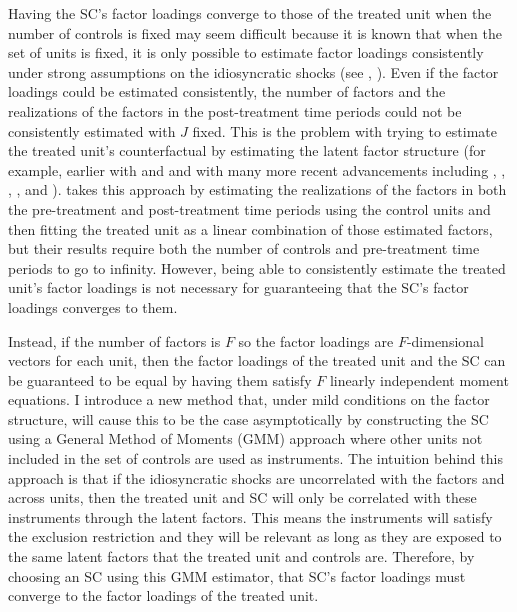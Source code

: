 \documentclass{article}
\begin{document}
\par
Having the SC's factor loadings converge to those of the treated unit when the number of controls is fixed may seem difficult because it is known that when the set of units is fixed, it is only possible to estimate factor loadings consistently under strong assumptions on the idiosyncratic shocks (see \cite{NumberOfFactors}, \cite{Anderson1984}). Even if the factor loadings could be estimated consistently, the number of factors and the realizations of the factors in the post-treatment time periods could not be consistently estimated with $J$ fixed. This is the problem with trying to estimate the treated unit's counterfactual by estimating the latent factor structure (for example, earlier with \cite{CHAMBERLAIN1984} and \cite{LiangandZeger} and with many more recent advancements including \cite{HeckamnLeamer2001}, \cite{MoonWeidner2015}, \cite{moon_weidner_2017}, \cite{Bai2009_ife}, and \cite{Pearson2006}). \cite{IFE_with_SC} takes this approach by estimating the realizations of the factors in both the pre-treatment and post-treatment time periods using the control units and then fitting the treated unit as a linear combination of those estimated factors, but their results require both the number of controls and pre-treatment time periods to go to infinity. However, being able to consistently estimate the treated unit's factor loadings is not necessary for guaranteeing that the SC's factor loadings converges to them.  
\par
Instead, if the number of factors is $F$ so the factor loadings are $F$-dimensional vectors for each unit, then the factor loadings of the treated unit and the SC can be guaranteed to be equal by having them satisfy $F$ linearly independent moment equations. I introduce a new method that, under mild conditions on the factor structure, will cause this to be the case asymptotically by constructing the SC using a General Method of Moments (GMM) approach where other units not included in the set of controls are used as instruments. The intuition behind this approach is that if the idiosyncratic shocks are uncorrelated with the factors and across units, then the treated unit and SC will only be correlated with these instruments through the latent factors. This means the instruments will satisfy the exclusion restriction and they will be relevant as long as they are exposed to the same latent factors that the treated unit and controls are. Therefore, by choosing an SC using this GMM estimator, that SC's factor loadings must converge to the factor loadings of the treated unit. 
\end{document}
